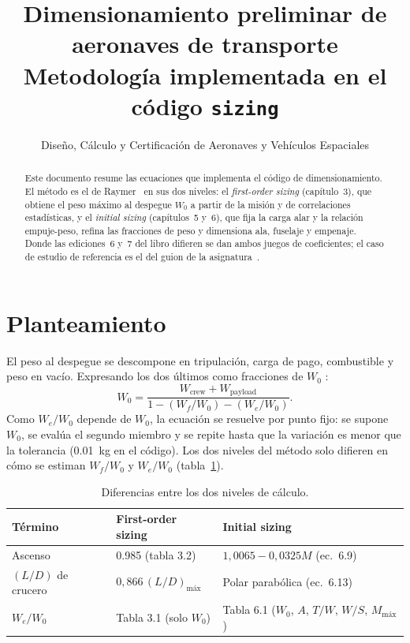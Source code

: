 \documentclass[11pt,a4paper]{article}
\title{Dimensionamiento preliminar de aeronaves de transporte\\[4pt]
       \large Metodología implementada en el código \texttt{sizing}}
\author{Diseño, Cálculo y Certificación de Aeronaves y Vehículos Espaciales}
\date{}
\newcommand{\WO}{W_0}
\begin{document}
\maketitle

\begin{abstract}
Este documento resume las ecuaciones que implementa el código de
dimensionamiento. El método es el de Raymer~\cite{raymer6,raymer7} en sus dos
niveles: el \emph{first-order sizing} (capítulo~3), que obtiene el peso máximo
al despegue $\WO$ a partir de la misión y de correlaciones estadísticas, y el
\emph{initial sizing} (capítulos~5 y~6), que fija la carga alar y la relación
empuje-peso, refina las fracciones de peso y dimensiona ala, fuselaje y
empenaje. Donde las ediciones~6 y~7 del libro difieren se dan ambos juegos de
coeficientes; el caso de estudio de referencia es el del guion de la
asignatura~\cite{guion}.
\end{abstract}

\section{Planteamiento}

El peso al despegue se descompone en tripulación, carga de pago, combustible y
peso en vacío. Expresando los dos últimos como fracciones de $\WO$
\cite[ec.~3.4]{raymer6}:
\begin{equation}
  \WO = \frac{W_\text{crew} + W_\text{payload}}
             {1 - \left(W_f/\WO\right) - \left(W_e/\WO\right)} .
  \label{eq:w0}
\end{equation}
Como $W_e/\WO$ depende de $\WO$, la ecuación se resuelve por punto fijo: se
supone $\WO$, se evalúa el segundo miembro y se repite hasta que la variación
es menor que la tolerancia (\SI{0.01}{kg} en el código). Los dos niveles del
método solo difieren en cómo se estiman $W_f/\WO$ y $W_e/\WO$
(tabla~\ref{tab:niveles}).

\begin{table}[h]
\centering
\caption{Diferencias entre los dos niveles de cálculo.}
\label{tab:niveles}
\begin{tabular}{lll}
\toprule
Término & First-order sizing & Initial sizing \\
\midrule
Ascenso            & \num{0.985} (tabla 3.2)            & $1{,}0065-0{,}0325M$ (ec.~6.9) \\
$(L/D)$ de crucero & $0{,}866\,(L/D)_\text{máx}$        & Polar parabólica (ec.~6.13) \\
$W_e/\WO$          & Tabla 3.1 (solo $\WO$)             & Tabla 6.1 ($\WO$, $A$, $T/W$, $W/S$, $M_\text{máx}$) \\
\bottomrule
\end{tabular}
\end{table}
\end{document}
